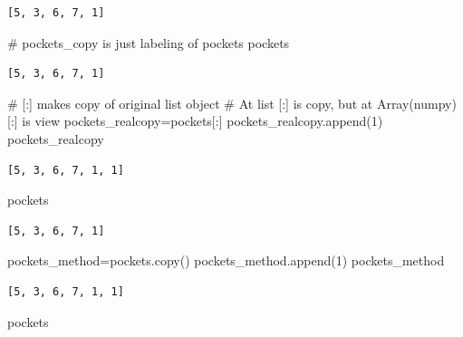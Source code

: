 \documentclass[
  a4paper,
  DIV=11,
  numbers=noendperiod]{scrreprt}
\newenvironment{Shaded}{\begin{snugshade}}{\end{snugshade}}
\newcommand{\CommentTok}[1]{\textcolor[rgb]{0.37,0.37,0.37}{#1}}
\newcommand{\DecValTok}[1]{\textcolor[rgb]{0.68,0.00,0.00}{#1}}
\newcommand{\NormalTok}[1]{\textcolor[rgb]{0.00,0.23,0.31}{#1}}
\newcommand{\OperatorTok}[1]{\textcolor[rgb]{0.37,0.37,0.37}{#1}}
\begin{document}
\begin{verbatim}
[5, 3, 6, 7, 1]
\end{verbatim}

\begin{Shaded}
\begin{Highlighting}[]
\CommentTok{\# pockets\_copy is just labeling of pockets}
\NormalTok{pockets}
\end{Highlighting}
\end{Shaded}

\begin{verbatim}
[5, 3, 6, 7, 1]
\end{verbatim}

\begin{Shaded}
\begin{Highlighting}[]
\CommentTok{\# [:] makes copy of original list object}
\CommentTok{\# At list [:] is copy, but at Array(numpy) [:] is view}
\NormalTok{pockets\_realcopy}\OperatorTok{=}\NormalTok{pockets[:]}
\NormalTok{pockets\_realcopy.append(}\DecValTok{1}\NormalTok{)}
\NormalTok{pockets\_realcopy}
\end{Highlighting}
\end{Shaded}

\begin{verbatim}
[5, 3, 6, 7, 1, 1]
\end{verbatim}

\begin{Shaded}
\begin{Highlighting}[]
\NormalTok{pockets}
\end{Highlighting}
\end{Shaded}

\begin{verbatim}
[5, 3, 6, 7, 1]
\end{verbatim}

\begin{Shaded}
\begin{Highlighting}[]
\NormalTok{pockets\_method}\OperatorTok{=}\NormalTok{pockets.copy()}
\NormalTok{pockets\_method.append(}\DecValTok{1}\NormalTok{)}
\NormalTok{pockets\_method}
\end{Highlighting}
\end{Shaded}

\begin{verbatim}
[5, 3, 6, 7, 1, 1]
\end{verbatim}

\begin{Shaded}
\begin{Highlighting}[]
\NormalTok{pockets}
\end{Highlighting}
\end{Shaded}
\end{document}
